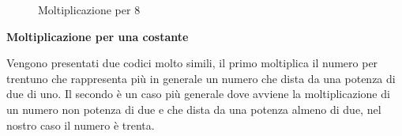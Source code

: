 \documentclass[12pt,a4paper]{report}
\begin{document}
 \begin{figure}
     \begin{subfigure}[b]{0.3\textwidth}
         
          	
		
		\label{Code:Mul8RISC}
     \end{subfigure}
     \hfill
     \begin{subfigure}[b]{0.3\textwidth}
         
          	

		\label{Code:Mul8ARM}
     \end{subfigure}
     \hfill
     \begin{subfigure}[b]{0.3\textwidth}
         
          	

		\label{Code:Mul8X86}
     \end{subfigure}
    
        \caption{Moltiplicazione per 8}
        \label{Fig:mult8}
\end{figure}

\vspace{0.3 cm}

\textbf{Moltiplicazione per una costante}

Vengono presentati due codici molto simili, il primo moltiplica il numero per trentuno che rappresenta più in generale un numero che dista da una potenza di due di uno. Il secondo è un caso più generale dove avviene la moltiplicazione di un numero non potenza di due e che dista da una potenza almeno di due, nel nostro caso il numero è trenta.

\vspace{0.2 cm }

\begin{figure}[ht]
	\begin{subfigure}[b]{0.4\textwidth}
         
          	
		
     \end{subfigure}
     \hfill
     \begin{subfigure}[b]{0.4\textwidth}
         
          	
		
     \end{subfigure}
     
\end{figure}
\end{document}
